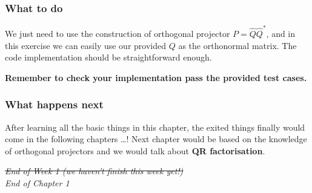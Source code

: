 \subsubsection*{What to do}%
We just need to use the construction of orthogonal projector $P = \hat{Q}\hat{Q}^*$, and in this exercise we can easily use our provided $Q$ as the orthonormal matrix. The code implementation should be straightforward enough. \medskip

\noindent \textbf{Remember to check your implementation pass the provided test cases.}
\subsubsection*{What happens next}%
\noindent After learning all the basic things in this chapter, the exited things finally would come in the following chapters \ldots! Next chapter would be based on the knowledge of orthogonal projectors and we would talk about \textbf{QR factorisation}. 

\bigskip

\begin{center}
  \textit{\large \st{End of Week 1 (we haven't finish this week yet!)}} \\
  \medskip
  \textit{\large End of Chapter 1}
\end{center}




